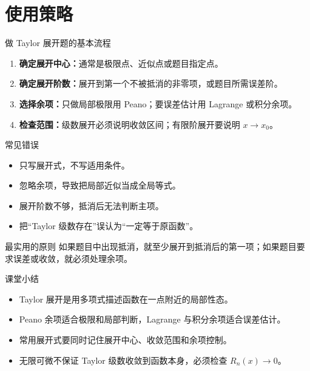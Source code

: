 \documentclass[aspectratio=169,11pt]{ctexbeamer}
\begin{document}
\section{使用策略}

\begin{frame}{做 Taylor 展开题的基本流程}
\small
\begin{enumerate}
  \item \textbf{确定展开中心：}通常是极限点、近似点或题目指定点。
  \item \textbf{确定展开阶数：}展开到第一个不被抵消的非零项，或题目所需误差阶。
  \item \textbf{选择余项：}只做局部极限用 Peano；要误差估计用 Lagrange 或积分余项。
  \item \textbf{检查范围：}级数展开必须说明收敛区间；有限阶展开要说明 $x\to x_0$。
\end{enumerate}
\end{frame}

\begin{frame}{常见错误}
\small
\begin{itemize}
  \item 只写展开式，不写适用条件。
  \item 忽略余项，导致把局部近似当成全局等式。
  \item 展开阶数不够，抵消后无法判断主项。
  \item 把“Taylor 级数存在”误认为“一定等于原函数”。
\end{itemize}

\begin{block}{最实用的原则}
如果题目中出现抵消，就至少展开到抵消后的第一项；如果题目要求误差或收敛，就必须处理余项。
\end{block}
\end{frame}

\begin{frame}{课堂小结}
\begin{itemize}
  \item Taylor 展开是用多项式描述函数在一点附近的局部性态。
  \item Peano 余项适合极限和局部判断，Lagrange 与积分余项适合误差估计。
  \item 常用展开式要同时记住展开中心、收敛范围和余项控制。
  \item 无限可微不保证 Taylor 级数收敛到函数本身，必须检查 $R_n(x)\to0$。
\end{itemize}
\end{frame}
\end{document}
